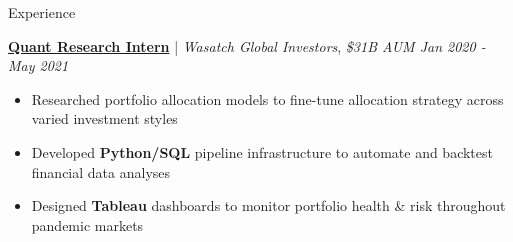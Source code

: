 \documentclass{content/resume/resume}
\begin{document}
\begin{rSection}{Experience}

  \href{https://wasatchglobal.com/}{\bf Quant Research Intern} | {\em Wasatch Global Investors}, {\em \$31B AUM \hfill Jan 2020 - May 2021}
  \vspace{-6pt}
  \begin{itemize}[nosep]
    \item Researched portfolio allocation models to fine-tune allocation strategy across varied investment styles
    \item Developed {\bf Python/SQL} pipeline infrastructure to automate and backtest financial data analyses
    \item Designed {\bf Tableau} dashboards to monitor portfolio health \& risk throughout pandemic markets
  \end{itemize}


\end{rSection}
\end{document}
